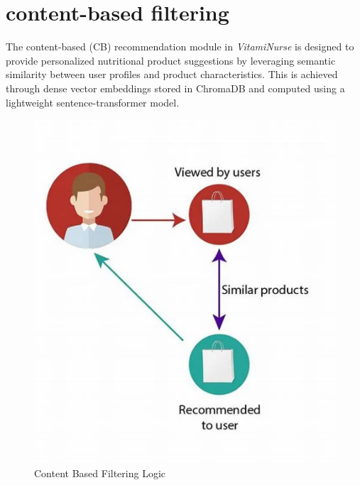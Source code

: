 \newpage
\section{content-based filtering}
The content-based (CB) recommendation module in \textit{VitamiNurse} is designed to provide personalized nutritional product suggestions by leveraging semantic similarity between user profiles and product characteristics. This is achieved through dense vector embeddings stored in ChromaDB and computed using a lightweight sentence-transformer model.
\begin{figure}[H]
    \centering
    \includegraphics[scale=0.35]{images/cb_filtering_logic.png}
    \caption{Content Based Filtering Logic} 
    \label{fig:CB_filtering_logic}
\end{figure}


